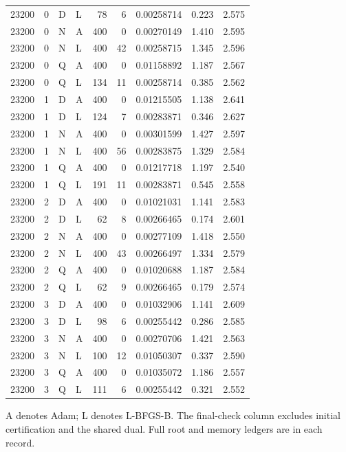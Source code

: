 \begin{longtable}{rrllrrrrr}
23200 & 0 & D & L & 78 & 6 & 0.00258714 & 0.223 & 2.575\\
23200 & 0 & N & A & 400 & 0 & 0.00270149 & 1.410 & 2.595\\
23200 & 0 & N & L & 400 & 42 & 0.00258715 & 1.345 & 2.596\\
23200 & 0 & Q & A & 400 & 0 & 0.01158892 & 1.187 & 2.567\\
23200 & 0 & Q & L & 134 & 11 & 0.00258714 & 0.385 & 2.562\\
23200 & 1 & D & A & 400 & 0 & 0.01215505 & 1.138 & 2.641\\
23200 & 1 & D & L & 124 & 7 & 0.00283871 & 0.346 & 2.627\\
23200 & 1 & N & A & 400 & 0 & 0.00301599 & 1.427 & 2.597\\
23200 & 1 & N & L & 400 & 56 & 0.00283875 & 1.329 & 2.584\\
23200 & 1 & Q & A & 400 & 0 & 0.01217718 & 1.197 & 2.540\\
23200 & 1 & Q & L & 191 & 11 & 0.00283871 & 0.545 & 2.558\\
23200 & 2 & D & A & 400 & 0 & 0.01021031 & 1.141 & 2.583\\
23200 & 2 & D & L & 62 & 8 & 0.00266465 & 0.174 & 2.601\\
23200 & 2 & N & A & 400 & 0 & 0.00277109 & 1.418 & 2.550\\
23200 & 2 & N & L & 400 & 43 & 0.00266497 & 1.334 & 2.579\\
23200 & 2 & Q & A & 400 & 0 & 0.01020688 & 1.187 & 2.584\\
23200 & 2 & Q & L & 62 & 9 & 0.00266465 & 0.179 & 2.574\\
23200 & 3 & D & A & 400 & 0 & 0.01032906 & 1.141 & 2.609\\
23200 & 3 & D & L & 98 & 6 & 0.00255442 & 0.286 & 2.585\\
23200 & 3 & N & A & 400 & 0 & 0.00270706 & 1.421 & 2.563\\
23200 & 3 & N & L & 100 & 12 & 0.01050307 & 0.337 & 2.590\\
23200 & 3 & Q & A & 400 & 0 & 0.01035072 & 1.186 & 2.557\\
23200 & 3 & Q & L & 111 & 6 & 0.00255442 & 0.321 & 2.552\\
\bottomrule\end{longtable}\normalsize
A denotes Adam; L denotes L-BFGS-B. The final-check column excludes initial certification and the shared dual. Full root and memory ledgers are in each record.
